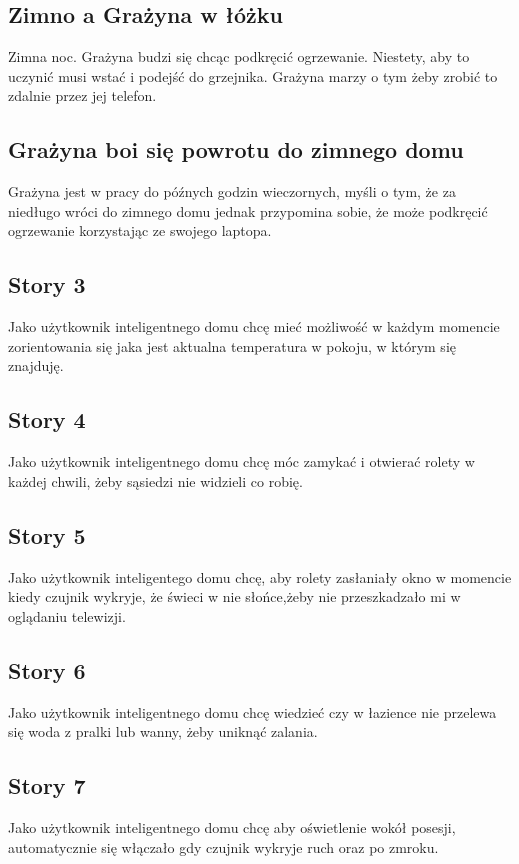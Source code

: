	\subsection{Zimno a Grażyna w łóżku}
	 Zimna noc. Grażyna budzi się chcąc podkręcić ogrzewanie. Niestety, aby to uczynić musi wstać i podejść do grzejnika. Grażyna marzy o tym żeby zrobić to zdalnie przez jej telefon.
	
	\subsection{Grażyna boi się powrotu do zimnego domu}
	Grażyna jest w pracy do późnych godzin wieczornych, myśli o tym, że za niedługo wróci do zimnego domu jednak przypomina sobie, że może podkręcić ogrzewanie korzystając ze swojego laptopa.
	
	\subsection{Story 3}
	Jako użytkownik inteligentnego domu chcę mieć możliwość w każdym momencie zorientowania się jaka jest aktualna temperatura w pokoju, w którym się znajduję.
	
	\subsection{Story 4}
	Jako użytkownik inteligentnego domu chcę móc zamykać i otwierać rolety w każdej chwili, żeby sąsiedzi nie widzieli co robię.
	
	\subsection{Story 5} 
	Jako użytkownik inteligentego domu chcę, aby rolety zasłaniały okno w momencie kiedy czujnik wykryje, że świeci w nie słońce,żeby nie przeszkadzało mi w oglądaniu telewizji.
	
	\subsection{Story 6}
	Jako użytkownik inteligentnego domu chcę wiedzieć czy w łazience nie przelewa się woda z pralki lub wanny, żeby uniknąć zalania. 
	
	\subsection{Story 7}
	Jako użytkownik inteligentnego domu chcę aby oświetlenie wokół posesji, automatycznie się włączało gdy czujnik wykryje ruch oraz po zmroku.
	
